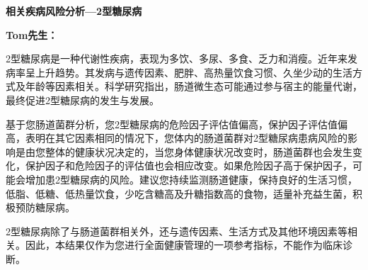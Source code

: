

\usepackage{graphicx}
\graphicspath{{cores/}}




\setlength{\arrayrulewidth}{0.5pt}
\fontsize{9.3pt}{17pt}\selectfont
\color{gray2}

\vspace*{0mm}
\begin{center}
{\bf\sanhao 相关疾病风险分析—2型糖尿病}
\end{center}

\medskip

\noindent
{\bf\xiaosihao Tom先生：}


\bigskip
2型糖尿病是一种代谢性疾病，表现为多饮、多尿、多食、乏力和消瘦。近年来发病率呈上升趋势。其发病与遗传因素、肥胖、高热量饮食习惯、久坐少动的生活方式及年龄等因素相关。科学研究指出，肠道微生态可能通过参与宿主的能量代谢，最终促进2型糖尿病的发生与发展。

基于您肠道菌群分析，您2型糖尿病的危险因子评估值偏高，保护因子评估值偏高，表明在其它因素相同的情况下，您体内的肠道菌群对2型糖尿病患病风险的影响是由您整体的健康状况决定的，当您身体健康状况改变时，肠道菌群也会发生变化，保护因子和危险因子的评估值也会相应改变。如果危险因子高于保护因子，可能会增加患2型糖尿病的风险。建议您持续监测肠道健康，保持良好的生活习惯，低脂、低糖、低热量饮食，少吃含糖高及升糖指数高的食物，适量补充益生菌，积极预防糖尿病。

2型糖尿病除了与肠道菌群相关外，还与遗传因素、生活方式及其他环境因素等相关。因此，本结果仅作为您进行全面健康管理的一项参考指标，不能作为临床诊断。

